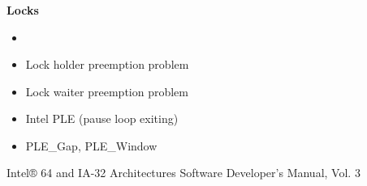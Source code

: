 \documentclass[usenames,dvipsnames, 18pt, compress, aspectratio=169]{beamer}
\begin{document}
\begin{frame}
    \frametitle{}
    \begin{center}
    \textbf{Locks}

        \begin{itemize}
            \item <+->
        \end{itemize}

        \begin{itemize}[label={\MVRightarrow}]
            \item <+-> Lock holder preemption problem
            \item <+-> Lock waiter preemption problem
            \item <+-> Intel PLE (pause loop exiting)
            \item <+-> PLE\_Gap, PLE\_Window
        \end{itemize}

        \normalsize{Intel® 64 and IA-32 Architectures Software Developer's Manual, Vol. 3}
    \end{center}
\end{frame}
\end{document}
